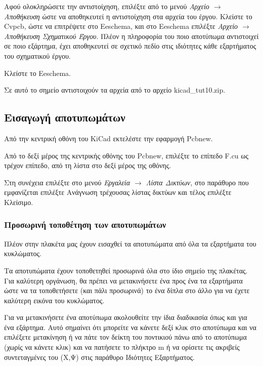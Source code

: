 \documentclass[a4paper]{article}
\begin{document}
Αφού ολοκληρώσετε την αντιστοίχηση, επιλέξτε από το μενού \textit{Αρχείο $\rightarrow$ Αποθήκευση} ώστε να αποθηκευτεί η αντιστοίχηση στα αρχεία του έργου. Κλείστε το \textenglish{Cvpcb}, ώστε να επιτρέψετε στο Eeschema, και στο Eeschema  επιλέξτε \textit{Αρχείο $\rightarrow$ Αποθήκευση Σχηματικού Έργου}. Πλέον η πληροφορία του ποιο αποτύπωμα αντιστοιχεί σε ποιο εξάρτημα, έχει αποθηκευτεί σε σχετικό πεδίο στις ιδιότητες κάθε εξαρτήματος του σχηματικού έργου. 

Κλείστε το \textenglish{Eeschema}.

Σε αυτό το σημείο αντιστοιχούν τα αρχεία από το αρχείο kicad\_tut10.zip.

\subsection{Εισαγωγή αποτυπωμάτων}
Από την κεντρική οθόνη του \textenglish{KiCad} εκτελέστε την εφαρμογή Pcbnew. 

Από το δεξί μέρος της κεντρικής οθόνης του Pcbnew, επιλέξτε το επίπεδο F.cu ως τρέχον επίπεδο, από τη λίστα στο δεξί μέρος της οθόνης.

Στη συνέχεια επιλέξτε στο μενού \textit{Εργαλεία $\rightarrow$ Λίστα Δικτύων}, στο παράθυρο που εμφανίζεται επιλέξτε Ανάγνωση τρέχουσας λίστας δικτύων και τέλος επιλέξτε Κλείσιμο.

\subsubsection{Προσωρινή τοποθέτηση των αποτυπωμάτων}
Πλέον στην πλακέτα μας έχουν εισαχθεί τα αποτυπώματα από όλα τα εξαρτήματα του κυκλώματος. 

Τα αποτυπώματα έχουν τοποθετηθεί προσωρινά όλα στο ίδιο σημείο της πλακέτας. Για καλύτερη οργάνωση, θα πρέπει να μετακινήσετε ένα προς ένα τα εξαρτήματα ώστε να τα τοποθετήσετε (και πάλι προσωρινά) το ένα δίπλα στο άλλο για να έχετε καλύτερη εικόνα του κυκλώματος. 

Για να μετακινήσετε ένα αποτύπωμα ακολουθείτε την ίδια διαδικασία όπως και για ένα εξάρτημα. Αυτό σημαίνει ότι μπορείτε να κάνετε δεξί κλικ στο αποτύπωμα και να επιλέξετε μετακίνηση ή να πάτε τον δείκτη του ποντικιού πάνω από το αποτύπωμα (χωρίς να κάνετε κλικ) και να πατήσετε το πλήκτρο m ή να ορίσετε τις ακριβείς συντεταγμένες του (Χ,Ψ) στις παράθυρο Ιδιότητες Εξαρτήματος. 
\end{document}
